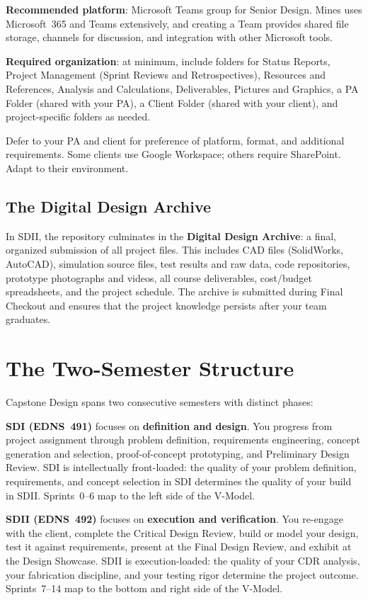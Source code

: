 \textbf{Recommended platform}: Microsoft Teams group for Senior Design. Mines uses Microsoft~365 and Teams extensively, and creating a Team provides shared file storage, channels for discussion, and integration with other Microsoft tools.

\textbf{Required organization}: at minimum, include folders for Status Reports, Project Management (Sprint Reviews and Retrospectives), Resources and References, Analysis and Calculations, Deliverables, Pictures and Graphics, a PA Folder (shared with your PA), a Client Folder (shared with your client), and project-specific folders as needed.

Defer to your PA and client for preference of platform, format, and additional requirements. Some clients use Google Workspace; others require SharePoint. Adapt to their environment.

\subsection{The Digital Design Archive}
In SDII, the repository culminates in the \textbf{Digital Design Archive}: a final, organized submission of all project files. This includes CAD files (SolidWorks, AutoCAD), simulation source files, test results and raw data, code repositories, prototype photographs and videos, all course deliverables, cost/budget spreadsheets, and the project schedule. The archive is submitted during Final Checkout and ensures that the project knowledge persists after your team graduates.


\section{The Two-Semester Structure}
Capstone Design spans two consecutive semesters with distinct phases:

\textbf{SDI (EDNS~491)} focuses on \textbf{definition and design}. You progress from project assignment through problem definition, requirements engineering, concept generation and selection, proof-of-concept prototyping, and Preliminary Design Review. SDI is intellectually front-loaded: the quality of your problem definition, requirements, and concept selection in SDI determines the quality of your build in SDII. Sprints~0--6 map to the left side of the V-Model.

\textbf{SDII (EDNS~492)} focuses on \textbf{execution and verification}. You re-engage with the client, complete the Critical Design Review, build or model your design, test it against requirements, present at the Final Design Review, and exhibit at the Design Showcase. SDII is execution-loaded: the quality of your CDR analysis, your fabrication discipline, and your testing rigor determine the project outcome. Sprints~7--14 map to the bottom and right side of the V-Model.

